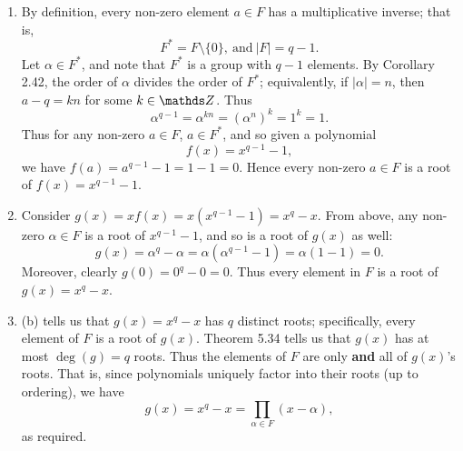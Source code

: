 \documentclass{homework}
\begin{document}
\begin{solution}
  \begin{enumerate}[label=(\alph*)]
    \item By definition, every non-zero element $a\in F$ has a multiplicative inverse; that is, \[
        F^*=F\setminus \{ 0 \}, ~\text{and}~ \left| F \right| =q-1
      .\] Let $\alpha\in F^*$, and note that $F^*$ is a group with $q-1$ elements. By Corollary 2.42,
      the order of $\alpha$ divides the order of $F^*$; equivalently, if $\left| \alpha \right| =n$,
      then $a-q=kn$ for some $k\in \Z$. Thus \[
        \alpha ^{q-1}=\alpha ^{kn}=(\alpha^n)^k=1^k=1
      .\] Thus for any non-zero $a\in F$, $a\in F^*$, and so given a polynomial \[
        f(x)=x^{q-1}-1
      ,\] we have $f(a)=a^{q-1}-1=1-1=0$. Hence every non-zero $a\in F$ is a root of $f(x)=x^{q-1}-1$.
    \item Consider $g(x)=xf(x)=x(x^{q-1}-1)=x^q-x$. From above, any non-zero $\alpha\in F$ is a root
      of $x^{q-1}-1$, and so is a root of $g(x)$ as well: \[
        g(x)=\alpha^q-\alpha=\alpha(\alpha ^{q-1}-1)=\alpha(1-1)=0
      .\] Moreover, clearly $g(0)=0^q-0=0$. Thus every element in $F$ is a root of $g(x)=x^q-x$.
    \item (b) tells us that $g(x)=x^{q}-x$ has $q$ distinct roots; specifically, every element of
      $F$ is a root of $g(x)$. Theorem 5.34 tells us that $g(x)$ has at most $\deg{(g)}=q$ roots.
      Thus the elements of $F$ are only \textbf{and} all of $g(x)$'s roots. That is, since
      polynomials uniquely factor into their roots (up to ordering), we have \[
        g(x)=x^q-x=\prod_{\alpha\in F}(x-\alpha)  
      ,\] as required.
  \end{enumerate}
\end{solution}
\end{document}
